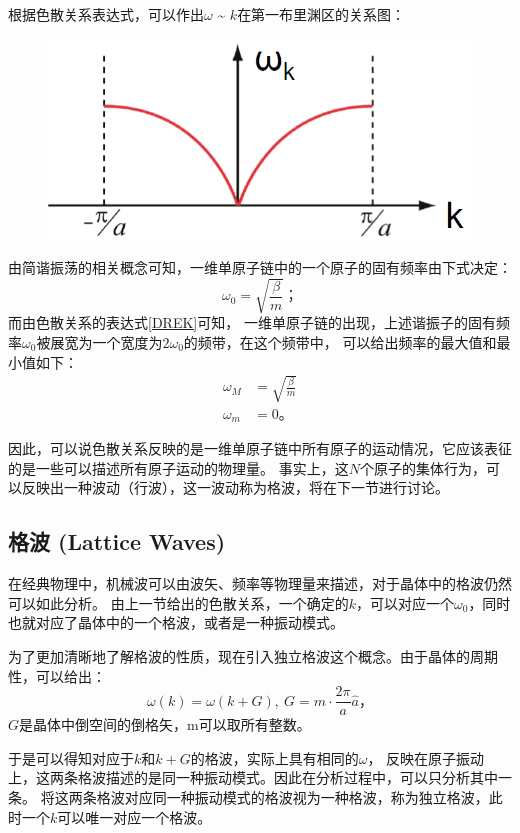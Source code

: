 \documentclass[declarePage]{ecnuthesis}
\begin{document}
根据色散关系表达式，可以作出$\omega$ \~{} $k$在第一布里渊区的关系图：
\begin{figure}[htb]
    \centering
    \includegraphics[width=.5\textwidth]{OmegaK.png}
    \label{OmegaK}
\end{figure}

由简谐振荡的相关概念可知，一维单原子链中的一个原子的固有频率由下式决定：
\begin{equation}
    \omega_0 = \sqrt{\frac{\beta}{m}} \text{；}
\end{equation}
而由色散关系的表达式\ref{DREK}可知，%
一维单原子链的出现，上述谐振子的固有频率$\omega_0$被展宽为一个宽度为$2\omega_0$的频带，在这个频带中，%
可以给出频率的最大值和最小值如下：
\begin{align}
    \omega_M &= \sqrt{\frac{\beta}{m}}\\
    \omega_m &= 0 \text{。}
\end{align}

因此，可以说色散关系反映的是一维单原子链中所有原子的运动情况，它应该表征的是一些可以描述所有原子运动的物理量。%
事实上，这$N$个原子的集体行为，可以反映出一种波动（行波），这一波动称为格波，将在下一节进行讨论。

\subsection{格波 (Lattice Waves)} \label{LW}

在经典物理中，机械波可以由波矢、频率等物理量来描述，对于晶体中的格波仍然可以如此分析。%
由上一节给出的色散关系，一个确定的$k$，可以对应一个$\omega_0$，同时也就对应了晶体中的一个格波，或者是一种振动模式。

为了更加清晰地了解格波的性质，现在引入独立格波这个概念。由于晶体的周期性，可以给出：
\begin{equation}
    \omega(k) = \omega(k+G),\ G=m \cdot \frac{2\pi}{a}\hat{a} \text{，}
\end{equation}
$G$是晶体中倒空间的倒格矢，m可以取所有整数。

于是可以得知对应于$k$和$k+G$的格波，实际上具有相同的$\omega$，%
反映在原子振动上，这两条格波描述的是同一种振动模式。因此在分析过程中，可以只分析其中一条。%
将这两条格波对应同一种振动模式的格波视为一种格波，称为独立格波，此时一个$k$可以唯一对应一个格波。
\end{document}
